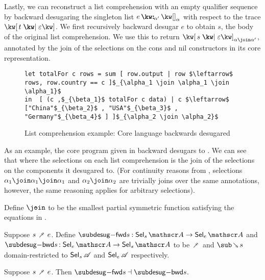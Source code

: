 Lastly, we can reconstruct a list comprehension with an empty qualifier sequence by backward desugaring the singleton list $\annCons{e}{\annNil{\alpha}}{\alpha'}$ with respect to the trace $\exListComp{t}{\seqEmpty}$. We first recursively backward desugar $e$ to obtain $s$, the body of the original list comprehension. We use this to return $\annListComp{s}{\seqEmpty}{\alpha \join \alpha'}$, annotated by the join of the selections on the cons and nil constructors in its core representation.

\begin{figure}[H]
\small
\begin{lstlisting}
let totalFor c rows = sum [ row.output | row $\leftarrow$ rows, row.country == c ]$_{\alpha_1 \join \alpha_1 \join \alpha_1}$
in  [ (c ,$_{\beta_1}$ totalFor c data) | c $\leftarrow$ ["China"$_{\beta_2}$ , "USA"$_{\beta_3}$ , "Germany"$_{\beta_4}$ ] ]$_{\alpha_2 \join \alpha_2}$
\end{lstlisting}
\caption{List comprehension example: Core language backwards desugared}
\label{fig:surface-language:example-5}
\end{figure}

\noindent
As an example, the core program given in  backward desugars to . We can see that where the selections on each list comprehension is the join of the selections on the components it desugared to. (For continuity reasons from , selections $\alpha_1 \join \alpha_1 \join \alpha_1$ and $\alpha_2 \join \alpha_2$ are trivially joins over the same annotations, however, the same reasoning applies for arbitrary selections).

\begin{definition}
   Define $\disjjoin$ to be the smallest partial symmetric function satisfying the equations in .
\end{definition}

\begin{definition}
     Suppose $s \desugarFwdR e$. Define $\desugarFwdF{s}: \Below{s} \to \Below{e}$ and $\desugarBwdF{s}: \Below{e} \to \Below{s}$ to be $\desugarFwdR$ and $\desugarBwdR{s}$ domain-restricted to $\textup{\textsf{Sel}}_{s}\,{\mathscr{A}}$ and $\textup{\textsf{Sel}}_{e}\,{\mathscr{A}}$ respectively.
\end{definition}

\begin{theorem}
  \label{thm:surface-language:desugar:gc}
     Suppose $s \desugarFwdR e$. Then $\desugarFwdF{s} \adjoint \desugarBwdF{s}$.
\end{theorem}

